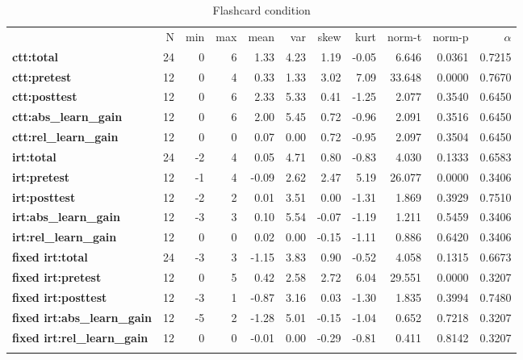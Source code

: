 \begin{longtable}[c]{@{}lrrrrrrrrrr@{}}
\caption{Flashcard condition}
\endfirsthead
\endhead
\toprule\addlinespace
& N & min & max & mean & var & skew & kurt & norm-t &
norm-p & $\alpha$
\\\addlinespace
\midrule
\textbf{ctt:total} & 24 & 0 & 6 & 1.33 & 4.23 & 1.19 & -0.05 & 6.646 &
0.0361 & 0.7215
\\\addlinespace
\textbf{ctt:pretest} & 12 & 0 & 4 & 0.33 & 1.33 & 3.02 & 7.09 & 33.648 &
0.0000 & 0.7670
\\\addlinespace
\textbf{ctt:posttest} & 12 & 0 & 6 & 2.33 & 5.33 & 0.41 & -1.25 & 2.077
& 0.3540 & 0.6450
\\\addlinespace
\textbf{ctt:abs\_learn\_gain} & 12 & 0 & 6 & 2.00 & 5.45 & 0.72 & -0.96
& 2.091 & 0.3516 & 0.6450
\\\addlinespace
\textbf{ctt:rel\_learn\_gain} & 12 & 0 & 0 & 0.07 & 0.00 & 0.72 & -0.95
& 2.097 & 0.3504 & 0.6450
\\\addlinespace
\textbf{irt:total} & 24 & -2 & 4 & 0.05 & 4.71 & 0.80 & -0.83 & 4.030 &
0.1333 & 0.6583
\\\addlinespace
\textbf{irt:pretest} & 12 & -1 & 4 & -0.09 & 2.62 & 2.47 & 5.19 & 26.077
& 0.0000 & 0.3406
\\\addlinespace
\textbf{irt:posttest} & 12 & -2 & 2 & 0.01 & 3.51 & 0.00 & -1.31 & 1.869
& 0.3929 & 0.7510
\\\addlinespace
\textbf{irt:abs\_learn\_gain} & 12 & -3 & 3 & 0.10 & 5.54 & -0.07 &
-1.19 & 1.211 & 0.5459 & 0.3406
\\\addlinespace
\textbf{irt:rel\_learn\_gain} & 12 & 0 & 0 & 0.02 & 0.00 & -0.15 & -1.11
& 0.886 & 0.6420 & 0.3406
\\\addlinespace
\textbf{fixed irt:total} & 24 & -3 & 3 & -1.15 & 3.83 & 0.90 & -0.52
& 4.058 & 0.1315 & 0.6673
\\\addlinespace
\textbf{fixed irt:pretest} & 12 & 0 & 5 & 0.42 & 2.58 & 2.72 & 6.04 &
29.551 & 0.0000 & 0.3207
\\\addlinespace
\textbf{fixed irt:posttest} & 12 & -3 & 1 & -0.87 & 3.16 & 0.03 &
-1.30 & 1.835 & 0.3994 & 0.7480
\\\addlinespace
\textbf{fixed irt:abs\_learn\_gain} & 12 & -5 & 2 & -1.28 & 5.01 &
-0.15 & -1.04 & 0.652 & 0.7218 & 0.3207
\\\addlinespace
\textbf{fixed irt:rel\_learn\_gain} & 12 & 0 & 0 & -0.01 & 0.00 &
-0.29 & -0.81 & 0.411 & 0.8142 & 0.3207
\\\addlinespace
\bottomrule
    \label{tab:comp_fc}
\end{longtable}

